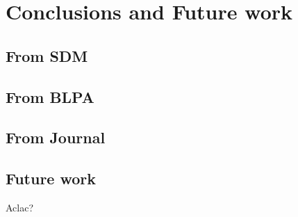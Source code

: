 \chapter{Conclusions and Future work}

\section{From SDM}
\section{From BLPA}
\section{From Journal}

\section{Future work}
Aclac?
